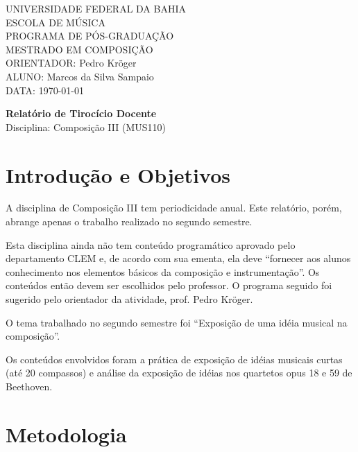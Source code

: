 \documentclass{article}
\begin{document}
\setlength{\parindent}{0cm}

\large
UNIVERSIDADE FEDERAL DA BAHIA \\
ESCOLA DE MÚSICA \\
PROGRAMA DE PÓS-GRADUAÇÃO \\
MESTRADO EM COMPOSIÇÃO \\
ORIENTADOR: Pedro Kröger \\
ALUNO: Marcos da Silva Sampaio \\
DATA: \today

\thispagestyle{empty}
\vspace{1cm}
\begin{center}{
    \Huge \textbf{Relatório de Tirocício Docente} \\
}
\vspace{12pt}
{\Large Disciplina: Composição III (MUS110)}

\end{center}
\vspace{1cm}

\section{Introdução e Objetivos}
\label{sec:introducao}


A disciplina de Composição III tem periodicidade anual. Este
relatório, porém, abrange apenas o trabalho realizado no segundo
semestre.

Esta disciplina ainda não tem conteúdo programático aprovado pelo
departamento CLEM e, de acordo com sua ementa, ela deve ``fornecer aos
alunos conhecimento nos elementos básicos da composição e
instrumentação''. Os conteúdos então devem ser escolhidos pelo
professor. O programa seguido foi sugerido pelo orientador da
atividade, prof. Pedro Kröger.

O tema trabalhado no segundo semestre foi ``Exposição de uma idéia
musical na composição''.


Os conteúdos envolvidos foram a prática de exposição de idéias
musicais curtas (até 20 compassos) e análise da exposição de idéias
nos quartetos opus 18 e 59 de Beethoven.

\section{Metodologia}
\label{sec:metodologia}
\end{document}
